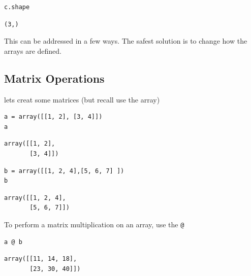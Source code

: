 \documentclass[%
oneside,                 %
final,                   %
10pt]{article}
\begin{document}
\begin{Verbatim}[numbers=none,fontsize=\fontsize{9pt}{9pt},baselinestretch=0.95,xleftmargin=2mm]
c.shape
\end{Verbatim}

\begin{Verbatim}[numbers=none,fontsize=\fontsize{9pt}{9pt},baselinestretch=0.95,xleftmargin=2mm]
(3,)
\end{Verbatim}

This can be addressed in a few ways. The safest solution is to change how the arrays are defined.

\subsection{Matrix Operations}

lets creat some matrices (but recall use the array)

\begin{Verbatim}[numbers=none,fontsize=\fontsize{9pt}{9pt},baselinestretch=0.95,xleftmargin=2mm]
a = array([[1, 2], [3, 4]])
a
\end{Verbatim}

\begin{Verbatim}[numbers=none,fontsize=\fontsize{9pt}{9pt},baselinestretch=0.95,xleftmargin=2mm]
array([[1, 2],
       [3, 4]])
\end{Verbatim}

\begin{Verbatim}[numbers=none,fontsize=\fontsize{9pt}{9pt},baselinestretch=0.95,xleftmargin=2mm]
b = array([[1, 2, 4],[5, 6, 7] ])
b
\end{Verbatim}

\begin{Verbatim}[numbers=none,fontsize=\fontsize{9pt}{9pt},baselinestretch=0.95,xleftmargin=2mm]
array([[1, 2, 4],
       [5, 6, 7]])
\end{Verbatim}

To perform a matrix multiplication on an array, use the \texttt{@}

\begin{Verbatim}[numbers=none,fontsize=\fontsize{9pt}{9pt},baselinestretch=0.95,xleftmargin=2mm]
a @ b
\end{Verbatim}

\begin{Verbatim}[numbers=none,fontsize=\fontsize{9pt}{9pt},baselinestretch=0.95,xleftmargin=2mm]
array([[11, 14, 18],
       [23, 30, 40]])
\end{Verbatim}
\end{document}
